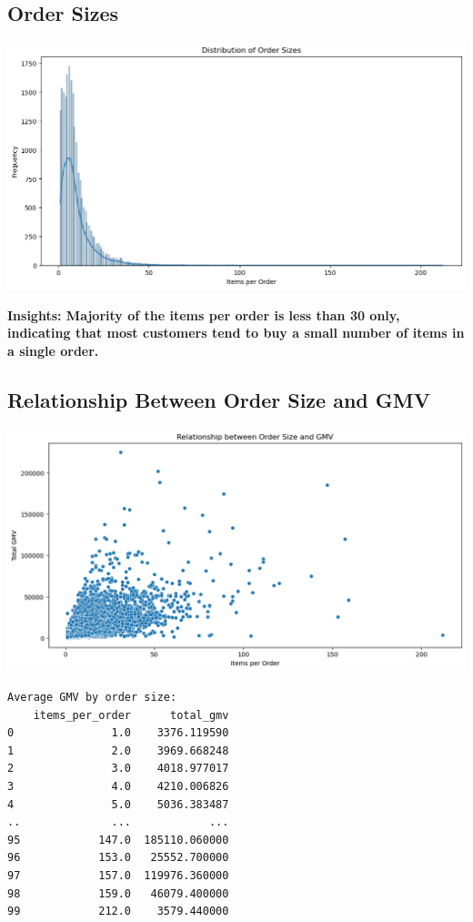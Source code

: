 \documentclass{article}
\begin{document}
    \subsection{Order Sizes}
    \begin{center}
       
            \includegraphics[width=1\columnwidth]{images/order-size.png}
      
    \end{center}
    \textbf{Insights: Majority of the items per order is less than 30 only,\\
     indicating that most customers tend to buy a small number of items in a single order.}
    
    \subsection{Relationship Between Order Size and GMV}
    \begin{center}
        \includegraphics[width=1\columnwidth]{images/order-gmv.png}
    \end{center}
    \begin{verbatim}
Average GMV by order size:
    items_per_order      total_gmv
0               1.0    3376.119590
1               2.0    3969.668248
2               3.0    4018.977017
3               4.0    4210.006826
4               5.0    5036.383487
..              ...            ...
95            147.0  185110.060000
96            153.0   25552.700000
97            157.0  119976.360000
98            159.0   46079.400000
99            212.0    3579.440000

    \end{verbatim}
    
\end{document}
